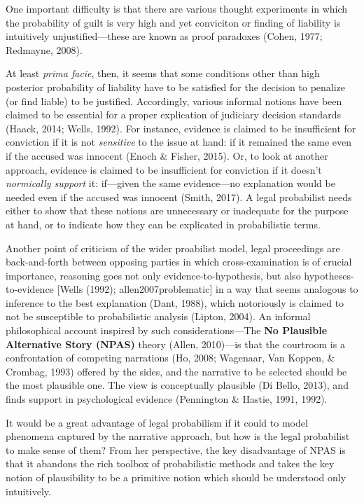 \documentclass[11pt,dvipsnames,enabledeprecatedfontcommands]{scrartcl}
\begin{document}
One important difficulty is that there are various thought experiments
in which the probability of guilt is very high and yet conviciton or
finding of liability is intuitively unjustified---these are known as
proof paradoxes (Cohen, 1977; Redmayne, 2008). 

At least \emph{prima facie}, then, it seems that some conditions other
than high posterior probability of liability have to be satisfied for
the decision to penalize (or find liable) to be justified. Accordingly,
various informal notions have been claimed to be essential for a proper
explication of judiciary decision standards (Haack, 2014; Wells, 1992).
For instance, evidence is claimed to be insufficient for conviction if
it is not \emph{sensitive} to the issue at hand: if it remained the same
even if the accused was innocent (Enoch \& Fisher, 2015). Or, to look at
another approach, evidence is claimed to be insufficient for conviction
if it doesn't \emph{normically support} it: if---given the same
evidence---no explanation would be needed even if the accused was
innocent (Smith, 2017). A legal probabilist needs either to show that
these notions are unnecessary or inadequate for the purpose at hand, or
to indicate how they can be explicated in probabilistic terms.


Another point of criticism of the wider proabilist model, legal
proceedings are back-and-forth between opposing parties in which
cross-examination is of crucial importance, reasoning goes not only
evidence-to-hypothesis, but also hypotheses-to-evidence {[}Wells (1992);
allen2007problematic{]} in a way that seems analogous to inference to
the best explanation (Dant, 1988), which notoriously is claimed to not
be susceptible to probabilistic analysis (Lipton, 2004). An informal
philosophical account inspired by such considerations---The
\textbf{No Plausible Alternative Story (NPAS)} theory (Allen, 2010)---is
that the courtroom is a confrontation of competing narrations (Ho, 2008;
Wagenaar, Van Koppen, \& Crombag, 1993) offered by the sides, and the
narrative to be selected should be the most plausible one. The view is
conceptually plausible (Di Bello, 2013), and finds support in
psychological evidence (Pennington \& Hastie, 1991, 1992).

It would be a great advantage of legal probabilism if it could to model
phenomena captured by the narrative approach, but how is the legal
probabilist to make sense of them? From her perspective, the key
disadvantage of NPAS is that it abandons the rich toolbox of
probabilistic methods and takes the key notion of plausibility to be a
primitive notion which should be understood only intuitively.
\end{document}

